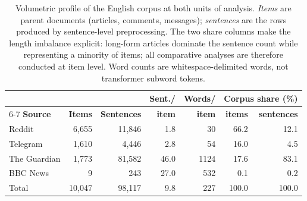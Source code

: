 \begin{table}[htbp]
\centering
\caption{Volumetric profile of the English corpus at both units of analysis. \emph{Items} are parent documents (articles, comments, messages); \emph{sentences} are the rows produced by sentence-level preprocessing. The two share columns make the length imbalance explicit: long-form articles dominate the sentence count while representing a minority of items; all comparative analyses are therefore conducted at item level. Word counts are whitespace-delimited words, not transformer subword tokens.}
\label{tab:corpus_two_level}
\small
\begin{tabular}{lrrrrrr}
\toprule
 & & & \textbf{Sent./} & \textbf{Words/} & \multicolumn{2}{c}{\textbf{Corpus share (\%)}} \\
\cmidrule(lr){6-7}
\textbf{Source} & \textbf{Items} & \textbf{Sentences} & \textbf{item} & \textbf{item} & \textbf{items} & \textbf{sentences} \\
\midrule
Reddit & 6,655 & 11,846 & 1.8 & 30 & 66.2 & 12.1 \\
Telegram & 1,610 & 4,446 & 2.8 & 54 & 16.0 & 4.5 \\
The Guardian & 1,773 & 81,582 & 46.0 & 1124 & 17.6 & 83.1 \\
BBC News & 9 & 243 & 27.0 & 532 & 0.1 & 0.2 \\
\midrule
Total & 10,047 & 98,117 & 9.8 & 227 & 100.0 & 100.0 \\
\bottomrule
\end{tabular}
\end{table}